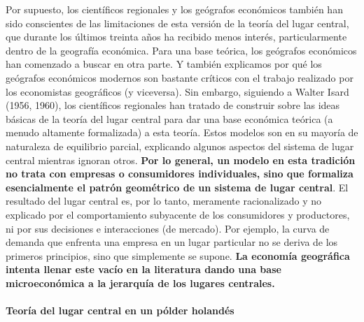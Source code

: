 Por supuesto, los científicos regionales y los geógrafos económicos también han sido conscientes de las limitaciones de esta versión de la teoría del lugar central, que durante los últimos treinta años ha recibido menos interés, particularmente dentro de la geografía económica. Para una base teórica, los geógrafos económicos han comenzado a buscar en otra parte. Y también explicamos por qué los geógrafos económicos modernos son bastante críticos con el trabajo realizado por los economistas geográficos (y viceversa). Sin embargo, siguiendo a Walter Isard (1956, 1960), los científicos regionales han tratado de construir sobre las ideas básicas de la teoría del lugar central para dar una base económica teórica (a menudo altamente formalizada) a esta teoría. Estos modelos son en su mayoría de naturaleza de equilibrio parcial, explicando algunos aspectos del sistema de lugar central mientras ignoran otros. \textbf{Por lo general, un modelo en esta tradición no trata con empresas o consumidores individuales, sino que formaliza esencialmente el patrón geométrico de un sistema de lugar central}. El resultado del lugar central es, por lo tanto, meramente racionalizado y no explicado por el comportamiento subyacente de los consumidores y productores, ni por sus decisiones e interacciones (de mercado). Por ejemplo, la curva de demanda que enfrenta una empresa en un lugar particular no se deriva de los primeros principios, sino que simplemente se supone. \textbf{La economía geográfica intenta llenar este vacío en la literatura dando una base microeconómica a la jerarquía de los lugares centrales.} 

\paragraph{Teoría del lugar central en un pólder holandés}

